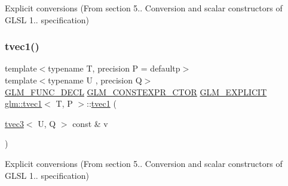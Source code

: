 Explicit conversions (From section 5.. Conversion and scalar constructors of G\+L\+SL 1.. specification) 

\mbox{\label{structglm_1_1tvec1_a8975bff3a3ce2e9be8205f94d54330aa}} 
\subsubsection{\texorpdfstring{tvec1()}{tvec1()}\hspace{0.1cm}{\footnotesize\ttfamily [7/14]}}
{\footnotesize\ttfamily template$<$typename T, precision P = defaultp$>$ \\
template$<$typename U , precision Q$>$ \\
\mbox{\hyperlink{setup_8hpp_ab2d052de21a70539923e9bcbf6e83a51}{G\+L\+M\+\_\+\+F\+U\+N\+C\+\_\+\+D\+E\+CL}} \mbox{\hyperlink{setup_8hpp_ad34178a09666081abdb573c14d1f4a5a}{G\+L\+M\+\_\+\+C\+O\+N\+S\+T\+E\+X\+P\+R\+\_\+\+C\+T\+OR}} \mbox{\hyperlink{setup_8hpp_a6c74f5a5e7b134ab69023ff9a30d4d5d}{G\+L\+M\+\_\+\+E\+X\+P\+L\+I\+C\+IT}} \mbox{\hyperlink{structglm_1_1tvec1}{glm\+::tvec1}}$<$ T, P $>$\+::\mbox{\hyperlink{structglm_1_1tvec1}{tvec1}} (\begin{DoxyParamCaption}\item[{\mbox{\hyperlink{structglm_1_1tvec3}{tvec3}}$<$ U, Q $>$ const \&}]{v }\end{DoxyParamCaption})}



Explicit conversions (From section 5.. Conversion and scalar constructors of G\+L\+SL 1.. specification) 

\mbox{\label{structglm_1_1tvec1_a9d01781ad635defad3e1fd64f02fda63}} 
